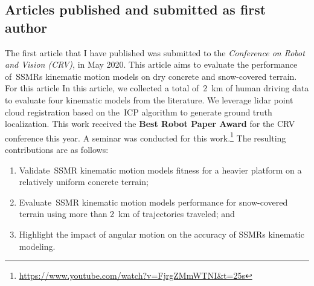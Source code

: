\documentclass[12pt,letterpaper,oneside]{article}
\begin{document}

\subsection{Articles published and submitted as first author}
\label{sec:first_author}
\begin{center}
	\textbf{} %
\end{center}
The first article that I have published was submitted to the \emph{Conference on Robot and Vision (CRV)}, in May 2020.
This article aims to evaluate the performance of~\acp{SSMR} kinematic motion models on dry concrete and snow-covered terrain.
For this article %
In this article, we collected a total of~\SI{2}{\kilo\meter} of human driving data to evaluate four kinematic models from the literature.
We leverage lidar point cloud registration based on the~\ac{ICP} algorithm to generate ground truth localization.
This work received the \textbf{Best Robot Paper Award} for the CRV conference this year.
A seminar was conducted for this work.\footnote{\url{https://www.youtube.com/watch?v=FjrgZMmWTNI&t=25s}}
The resulting contributions are as follows:
\begin{enumerate}
	\item Validate~\ac{SSMR} kinematic motion models fitness for a heavier platform on a relatively uniform concrete terrain;
	\item Evaluate~\ac{SSMR} kinematic motion models performance for snow-covered terrain using more than \SI{2}{\kilo\meter} of trajectories traveled; and
	\item Highlight the impact of angular motion on the accuracy of \acp{SSMR} kinematic modeling.
\end{enumerate}
\end{document}

